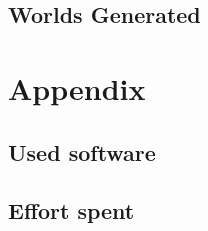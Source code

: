 \documentclass{article}
\begin{document}
\subsection{Worlds Generated}

\clearpage
\section{Appendix}

\subsection{Used software}


\subsection{Effort spent}
\end{document}
